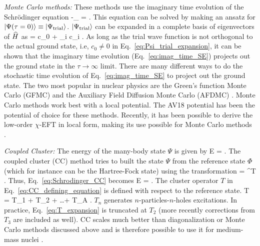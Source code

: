 	\li
	\emph{Monte Carlo methods:}
	These methods use the imaginary time evolution of the Schr\"{o}dinger
	equation
	\beq
	-\partial_\tau \ket{\Psi(\tau)} =  \ket{\Psi(\tau)} \;.
	\label{eq:imag_time_SE}
	\eeq
	This equation can be solved by making an ansatz for
	${|\Psi(\tau = 0)\rangle} \equiv {|\Psi_{\rm trial}\rangle}$.
	${|\Psi_{\rm trial}\rangle}$ can be expanded in a complete basis of eigenvectors
	of $\widehat{H}$ as
	\beq
	 = c_0  +
	\sum_{i } c_i  \;.
	\label{eq:Psi_trial_expansion}
	\eeq
	As long as the trial wave function is not orthogonal to the actual ground
	state, i.e, $c_0 \neq 0$ in Eq.~\eqref{eq:Psi_trial_expansion}, it can
	be shown that the imaginary time evolution (Eq.~\eqref{eq:imag_time_SE})
	projects out the ground state in the $\tau \to \infty$ limit.  There are many
	different ways to do the stochastic time evolution of
	Eq.~\eqref{eq:imag_time_SE} to project out the ground state.  The two
	most popular in nuclear physics are the Green's function Monte Carlo (GFMC)
	\cite{Pieper:2002ne, Pieper:2007ax}
	and the Auxiliary Field Diffusion Monte Carlo (AFDMC)
	\cite{Gandolfi:2007hs, Gezerlis:2014zia}.  Monte Carlo methods
	work best with a local potential.  The AV18 potential has been the
	potential	of choice for these methods.  Recently, it has been possible to
	derive the low-order $\chi$-EFT in local form, making its use possible
	for Monte Carlo methods \cite{Gezerlis:2014zia}.

	\li
	\emph{Coupled Cluster:} The energy of the many-body state $\Psi$ is given
	by
	\beq
	E = \;.
	\label{eq:Schrodinger_CC}
	\eeq
	The coupled cluster (CC) method tries to built the state $\Psi$ from the
	reference state $\Phi$ (which for instance can be the Hartree-Fock state)
	using the transformation
	\beq
	\ket{\Psi} = \ee^T \ket{\Phi}\;.
	\label{eq:CC_defining_equation}
	\eeq
	Thus, Eq.~\eqref{eq:Schrodinger_CC} becomes
	\beq
	E = \;.
	\eeq
	The cluster operator $T$ in Eq.~\eqref{eq:CC_defining_equation}
	is defined with respect to the reference state.
	\beq
	T = T_1 + T_2 + \ldots + T_A \;.
	\label{eq:T_expansion}
	\eeq
	$T_n$ generates $n$-particles-$n$-holes excitations.  In practice,
	Eq.~\eqref{eq:T_expansion} is truncated at $T_2$
	(more recently corrections from $T_3$ are included as well).  CC
	scales much better than diagonalization or Monte Carlo methods discussed
	above and is therefore possible to use it for medium-mass nuclei
	\cite{Hagen:2013nca}.

